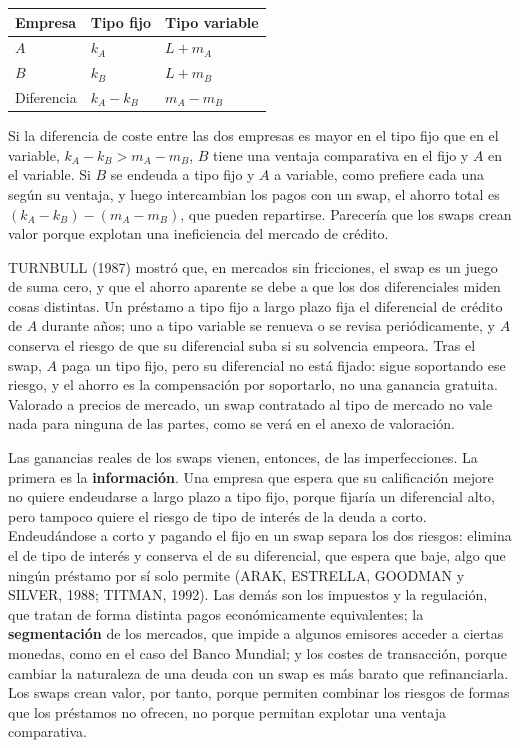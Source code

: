 \documentclass[10pt,a4paper]{article}
\newcounter{anexo}
\begin{document}
\begin{center}
\small
\renewcommand{\arraystretch}{1.4}
\begin{tabular}{|p{3.0cm}|p{3.0cm}|p{3.0cm}|}
    \hline
    \centering\textbf{Empresa} & \centering\textbf{Tipo fijo} & \centering\textbf{Tipo variable}\tabularnewline
    \hline
    \raggedright $A$ & \centering $k_A$ & \centering $L+m_A$\tabularnewline
    \hline
    \raggedright $B$ & \centering $k_B$ & \centering $L+m_B$\tabularnewline
    \hline
    \raggedright Diferencia & \centering $k_A-k_B$ & \centering $m_A-m_B$\tabularnewline
    \hline
\end{tabular}
\end{center}

Si la diferencia de coste entre las dos empresas es mayor en el tipo fijo que en el variable, $k_A-k_B>m_A-m_B$, $B$ tiene una ventaja comparativa en el fijo y $A$ en el variable. Si $B$ se endeuda a tipo fijo y $A$ a variable, como prefiere cada una según su ventaja, y luego intercambian los pagos con un swap, el ahorro total es $(k_A-k_B)-(m_A-m_B)$, que pueden repartirse. Parecería que los swaps crean valor porque explotan una ineficiencia del mercado de crédito.

TURNBULL (1987) mostró que, en mercados sin fricciones, el swap es un juego de suma cero, y que el ahorro aparente se debe a que los dos diferenciales miden cosas distintas. Un préstamo a tipo fijo a largo plazo fija el diferencial de crédito de $A$ durante años; uno a tipo variable se renueva o se revisa periódicamente, y $A$ conserva el riesgo de que su diferencial suba si su solvencia empeora. Tras el swap, $A$ paga un tipo fijo, pero su diferencial no está fijado: sigue soportando ese riesgo, y el ahorro es la compensación por soportarlo, no una ganancia gratuita. Valorado a precios de mercado, un swap contratado al tipo de mercado no vale nada para ninguna de las partes, como se verá en el anexo de valoración.

Las ganancias reales de los swaps vienen, entonces, de las imperfecciones. La primera es la \textbf{información}. Una empresa que espera que su calificación mejore no quiere endeudarse a largo plazo a tipo fijo, porque fijaría un diferencial alto, pero tampoco quiere el riesgo de tipo de interés de la deuda a corto. Endeudándose a corto y pagando el fijo en un swap separa los dos riesgos: elimina el de tipo de interés y conserva el de su diferencial, que espera que baje, algo que ningún préstamo por sí solo permite (ARAK, ESTRELLA, GOODMAN y SILVER, 1988; TITMAN, 1992). Las demás son los impuestos y la regulación, que tratan de forma distinta pagos económicamente equivalentes; la \textbf{segmentación} de los mercados, que impide a algunos emisores acceder a ciertas monedas, como en el caso del Banco Mundial; y los costes de transacción, porque cambiar la naturaleza de una deuda con un swap es más barato que refinanciarla. Los swaps crean valor, por tanto, porque permiten combinar los riesgos de formas que los préstamos no ofrecen, no porque permitan explotar una ventaja comparativa.
\end{document}
